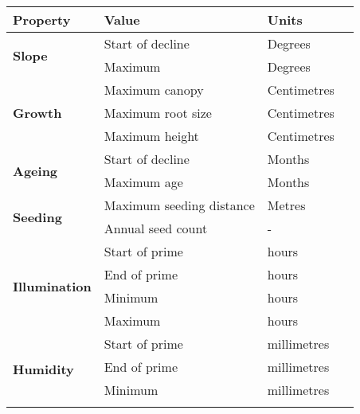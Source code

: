 \begin{table}[]
  \centering
	    \begin{tabular}{|p{4cm}|p{7cm}|p{2cm}|p{0cm}|}
		\hline	
		\textbf{Property} & \textbf{Value} & \textbf{Units} \\
		\hline
		\multirow{2}{*}{\textbf{Slope}} & \multicolumn{1}{l|}{Start of decline} & \multicolumn{1}{l|}{Degrees} \\\cline{2-3}
        						   & \multicolumn{1}{l|}{Maximum} & \multicolumn{1}{l|}{Degrees} \\
		\hline
		\multirow{3}{*}{\textbf{Growth}} & \multicolumn{1}{l|}{Maximum canopy} & \multicolumn{1}{l|}{Centimetres} \\\cline{2-3}
        						   & \multicolumn{1}{l|}{Maximum root size} & \multicolumn{1}{l|}{Centimetres} \\\cline{2-3}
                               & \multicolumn{1}{l|}{Maximum height} & \multicolumn{1}{l|}{Centimetres} \\
		\hline
		\multirow{2}{*}{\textbf{Ageing}} & \multicolumn{1}{l|}{Start of decline} & \multicolumn{1}{l|}{Months} \\\cline{2-3}
        						   & \multicolumn{1}{l|}{Maximum age} & \multicolumn{1}{l|}{Months} \\
		\hline    
		\multirow{2}{*}{\textbf{Seeding}} & \multicolumn{1}{l|}{Maximum seeding distance} & \multicolumn{1}{l|}{Metres} \\\cline{2-3}
        						   & \multicolumn{1}{l|}{Annual seed count} & \multicolumn{1}{l|}{ - } \\
		\hline    
		\multirow{4}{*}{\textbf{Illumination}}
								& \multicolumn{1}{l|}{Start of prime} & \multicolumn{1}{l|}{hours} \\\cline{2-3}
								& \multicolumn{1}{l|}{End of prime} & \multicolumn{1}{l|}{hours} \\\cline{2-3}
								& \multicolumn{1}{l|}{Minimum} & \multicolumn{1}{l|}{hours} \\\cline{2-3}
								& \multicolumn{1}{l|}{Maximum} & \multicolumn{1}{l|}{hours} \\
		\hline   
		\multirow{4}{*}{\textbf{Humidity}}
								& \multicolumn{1}{l|}{Start of prime} & \multicolumn{1}{l|}{millimetres} \\\cline{2-3}
								& \multicolumn{1}{l|}{End of prime} & \multicolumn{1}{l|}{millimetres} \\\cline{2-3}
								& \multicolumn{1}{l|}{Minimum} & \multicolumn{1}{l|}{millimetres} \\\cline{2-3}

\end{tabular}
\end{table}
